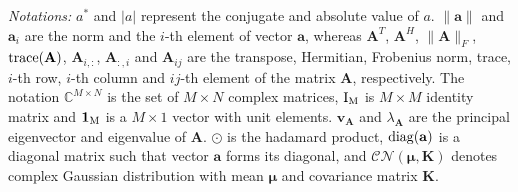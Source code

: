 \documentclass[journal,draftclsnofoot,onecolumn,12pt]{IEEEtran}
\begin{document}
\begin{enumerate}
\end{enumerate}
{\em Notations:} $a^*$ and $|a|$ represent the conjugate and absolute value of $a$. $\left\lVert \mathbf{a} \right\lVert$ and $\mathbf{a}_i$ are the norm and the $i$-th element of vector $\mathbf{a}$, whereas $\mathbf{A}^T$, $\mathbf{A}^H$, $\|\mathbf{A}\|_F$, ${\rm trace}(\mathbf{A})$,  $\mathbf{A}_{i,:}$, $\mathbf{A}_{:,i}$ and $\mathbf{A}_{ij}$ are the transpose, Hermitian, Frobenius norm, trace, $i$-th row, $i$-th column and $ij$-th element of the matrix $\mathbf{A}$, respectively. The notation $\mathbb{C}^{M\times N}$ is the set of  $M \times N$ complex matrices, ${\rm I_M}$ is $M\times M$ identity matrix and $\mathbf{1}_{\rm M}$ is a $M\times 1$ vector with unit elements. $\mathbf{v_A}$ and $\lambda_\mathbf{A}$ are the principal eigenvector and eigenvalue of  $\mathbf{A}$.  $\odot$ is the hadamard product, $\rm{diag}(\mathbf{a})$ is a diagonal matrix such that vector $\mathbf{a}$ forms its diagonal, and $\mathcal{CN}(\boldsymbol{\mu},\mathbf{K})$ denotes complex  Gaussian distribution with mean $\boldsymbol{\mu}$ and covariance matrix $\mathbf{K}$.
\end{document}
